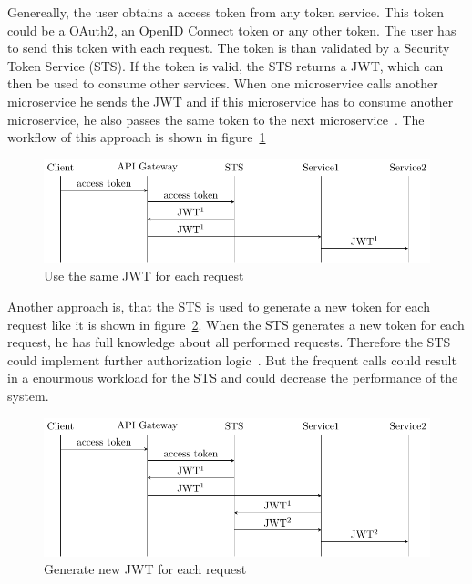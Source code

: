 Genereally, the user obtains a access token from any token service.
This token could be a OAuth2, an OpenID Connect token or any other token.
The user has to send this token with each request.
The token is than validated by a Security Token Service (STS).
If the token is valid, the STS returns a JWT, which can then be used to consume other services.
When one microservice calls another microservice he sends the JWT and if this microservice has to consume another microservice, he also passes the same token to the next microservice~\cite{dias2020microservices}.
The workflow of this approach is shown in figure~\ref{fig:mtls_id_1}
\begin{figure}
    \centering
	\includegraphics{images/authentication-mechanisms/TikZ_jwt_identity_1.pdf}
    \caption{Use the same JWT for each request~\cite{dias2020microservices}}
	\label{fig:mtls_id_1}
\end{figure}

Another approach is, that the STS is used to generate a new token for each request like it is shown in figure~\ref{fig:mtls_id_2}.
When the STS generates a new token for each request, he has full knowledge about all performed requests.
Therefore the STS could implement further authorization logic~\cite{dias2020microservices}.
But the frequent calls could result in a enourmous workload for the STS and could decrease the performance of the system.

\begin{figure}[H]
	\centering
	\includegraphics{images/authentication-mechanisms/TikZ_jwt_identity_2.pdf}
	\caption{Generate new JWT for each request~\cite{dias2020microservices}}
	\label{fig:mtls_id_2}
\end{figure}

